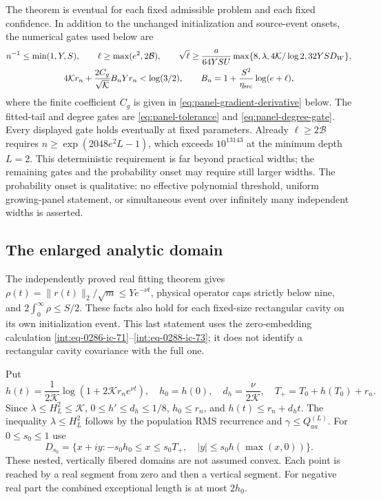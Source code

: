 The theorem is eventual for each fixed admissible problem and each
fixed confidence.  In addition to the unchanged initialization and
source-event onsets, the numerical gates used below are
\begin{gather}
 n^{-1}\le\min(1,Y,S),\qquad
 \ell\ge\max(e^2,2\mathcal B),\qquad
 \sqrt\ell\ge \frac{a}{64YSU}
       \max\{8,\lambda,4\mathcal K/\log2,32YSD_W\},
 \label{eq:panel-old-gates}\\
 4\mathcal K r_n+
     \frac{2C_g}{\sqrt{\mathcal K}}B_nYr_n<\log(3/2),
 \qquad B_n=1+\frac{S^2}{\eta_{\rm src}}\log(e+\ell),
 \label{eq:panel-new-gate}
\end{gather}
where the finite coefficient \(C_g\) is given in
\eqref{eq:panel-gradient-derivative} below.  The fitted-tail and degree
gates are \eqref{eq:panel-tolerance} and \eqref{eq:panel-degree-gate}.
Every displayed gate holds eventually at fixed parameters.  Already
\(\ell\ge2\mathcal B\) requires
\(n\ge\exp(2048e^2L-1)\), which exceeds \(10^{13143}\) at
the minimum depth \(L=2\).  This deterministic requirement is far
beyond practical widths; the remaining gates and the probability onset
may require still larger widths.  The probability onset is qualitative:
no effective polynomial threshold,
uniform growing-panel statement, or simultaneous event over infinitely
many independent widths is asserted.

\subsection{The enlarged analytic domain}
\label{sec:panel-domain}

The independently proved real fitting theorem gives
\(\rho(t)=\|r(t)\|_2/\sqrt m\le Ye^{-\nu t}\), physical operator
caps strictly below nine, and \(2\int_0^\infty\rho\le S/2\).
These facts also hold for each fixed-size rectangular cavity on its
own initialization event.  This last statement uses the zero-embedding
calculation \eqref{int:eq-0286-ic-71}--\eqref{int:eq-0288-ic-73}; it
does not identify a rectangular cavity covariance with the full one.

Put
\begin{equation}
 h(t)=\frac1{2\mathcal K}\log(1+2\mathcal K r_ne^{\nu t}),\quad
 h_0=h(0),\quad d_h=\frac\nu{2\mathcal K},\quad
 T_+=T_0+h(T_0)+r_n.
 \label{eq:panel-flaring-height}
\end{equation}
Since \(\lambda\le H_L^2\le\mathcal K\),
\(0\le h'\le d_h\le1/8\), \(h_0\le r_n\), and
\(h(t)\le r_n+d_ht\).  The inequality \(\lambda\le H_L^2\)
follows by the population RMS recurrence and
\(\gamma\le Q^{(L)}_{aa}\).  For \(0\le s_0\le1\) use
\[
 D_{s_0}=\{x+iy:-s_0h_0\le x\le s_0T_+,\quad
                     |y|\le s_0h(\max(x,0))\}.
\]
These nested, vertically fibered domains are not assumed convex.
Each point is reached by a real segment from zero and then a vertical
segment.  For negative real part the combined exceptional length is
at most \(2h_0\).

